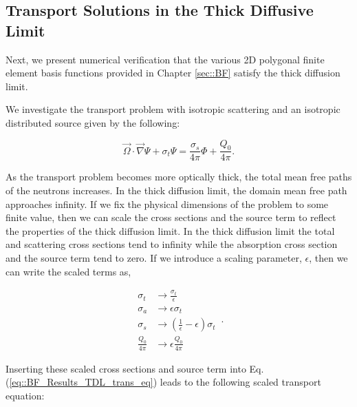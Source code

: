 \subsection{Transport Solutions in the Thick Diffusive Limit}
\label{sec::DSA_Results_TDL}

Next, we present numerical verification that the various 2D polygonal finite element basis functions provided in Chapter \ref{sec::BF} satisfy the thick diffusion limit. 


We investigate the transport problem with isotropic scattering and an isotropic distributed source given by the following:

\begin{equation}
\label{eq::BF_Results_TDL_trans_eq}
\vec{\Omega} \cdot \vec{\nabla} \Psi + \sigma_t \Psi =   \frac{\sigma_s}{4 \pi} \Phi +  \frac{Q_0}{4 \pi}.
\end{equation}

\noindent As the transport problem becomes more optically thick, the total mean free paths of the neutrons increases. In the thick diffusion limit, the domain mean free path approaches infinity. If we fix the physical dimensions of the problem to some finite value, then we can scale the cross sections and the source term to reflect the properties of the thick diffusion limit. In the thick diffusion limit the total and scattering cross sections tend to infinity while the absorption cross section and the source term tend to zero. If we introduce a scaling parameter, $\epsilon$, then we can write the scaled terms as,

\begin{equation}
\label{eq::BF_Results_TDL_scaling}
\begin{aligned}
	\sigma_t &\rightarrow \frac{\sigma_t}{\epsilon} \\
	\sigma_a &\rightarrow \epsilon \sigma_t\\
	\sigma_s &\rightarrow \left( \frac{1}{\epsilon} - \epsilon   \right) \sigma_t \\
	\frac{Q_0}{4 \pi} &\rightarrow \epsilon \frac{Q_0}{4 \pi}
\end{aligned} \, .
\end{equation}

\noindent Inserting these scaled cross sections and source term into Eq. (\ref{eq::BF_Results_TDL_trans_eq}) leads to the following scaled transport equation:


